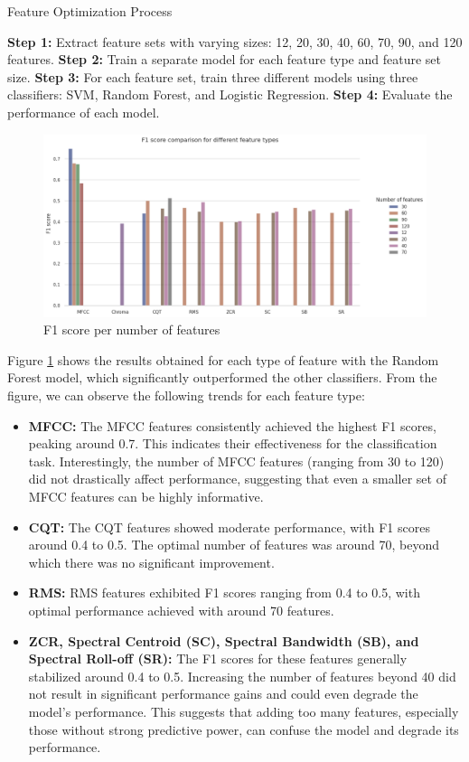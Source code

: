 \begin{algorithm}
    \caption{Feature Optimization Process}
    \begin{algorithmic}[1]
        \State \textbf{Step 1:} Extract feature sets with varying sizes: 12, 20, 30, 40, 60, 70, 90, and 120 features.
        \State \textbf{Step 2:} Train a separate model for each feature type and feature set size.
        \State \textbf{Step 3:} For each feature set, train three different models using three classifiers: SVM, Random Forest,
        and Logistic Regression.
        \State \textbf{Step 4:} Evaluate the performance of each model.
    \end{algorithmic}
\end{algorithm}

\begin{figure}[htbp]
    \centering
    \includegraphics[width=.8\textwidth]{../images/n_feature_per_type.png}
    \caption{F1 score per number of features}
    \label{fig:n_feature_per_type}
\end{figure}

\noindent
Figure \ref{fig:n_feature_per_type} shows the results obtained for each type of feature with the Random Forest model,
which significantly outperformed the other classifiers.
From the figure, we can observe the following trends for each feature type:
\begin{itemize}
    \item \textbf{MFCC:} The MFCC features consistently achieved the highest F1 scores, peaking around 0.7.
          This indicates their effectiveness for the classification task. Interestingly, the number of MFCC features (ranging from 30 to 120)
          did not drastically affect performance, suggesting that even a smaller set of MFCC features can be highly informative.
    \item \textbf{CQT:} The CQT features showed moderate performance, with F1 scores around 0.4 to 0.5. The optimal number of features was around 70,
          beyond which there was no significant improvement.
    \item \textbf{RMS:} RMS features exhibited F1 scores ranging from 0.4 to 0.5, with optimal performance achieved with around 70 features.
    \item \textbf{ZCR, Spectral Centroid (SC), Spectral Bandwidth (SB), and Spectral Roll-off (SR):}
          The F1 scores for these features generally stabilized around 0.4 to 0.5.
          Increasing the number of features beyond 40 did not result in significant performance gains and could even degrade the model's performance.
          This suggests that adding too many features, especially those without strong predictive power, can confuse the model and degrade its performance.
\end{itemize}
